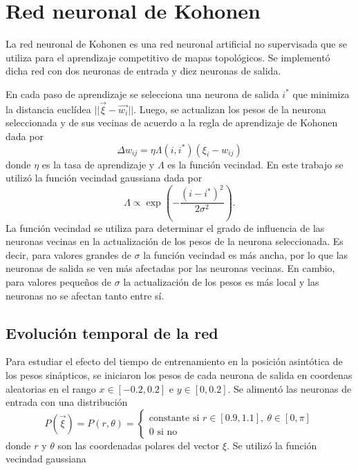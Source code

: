 \documentclass[11pt,twocolumn,twoside]{opticajnl}
\begin{document}
\section{Red neuronal de Kohonen \label{sec:ej1}}

\vspace{0.3cm}

La red neuronal de Kohonen es una red neuronal artificial no supervisada que se utiliza para el aprendizaje competitivo de mapas topológicos. Se implementó dicha red con dos neuronas de entrada y diez neuronas de salida. 

En cada paso de aprendizaje se selecciona una neurona de salida $i^*$ que minimiza la distancia euclídea $||\vec{\xi} - \vec{w_i}||$. Luego, se actualizan los pesos de la neurona seleccionada y de sus vecinas de acuerdo a la regla de aprendizaje de Kohonen dada por
\begin{equation}
    \Delta w_{ij} = \eta \Lambda(i,i^*) (\xi_i - w_{ij})
\end{equation}
donde $\eta$ es la tasa de aprendizaje y $\Lambda$ es la función vecindad. En este trabajo se utilizó la función vecindad gaussiana dada por 
\begin{equation}
    \Lambda \propto \exp(-\frac{(i-i^*)^2}{2\sigma^2}).
\end{equation}
La función vecindad se utiliza para determinar el grado de influencia de las neuronas vecinas en la actualización de los pesos de la neurona seleccionada. Es decir, para valores grandes de $\sigma$ la función vecindad es más ancha, por lo que las neuronas de salida se ven más afectadas por las neuronas vecinas. En cambio, para valores pequeños de $\sigma$ la actualización de los pesos es más local y las neuronas no se afectan tanto entre sí. 

\subsection{Evolución temporal de la red}

Para estudiar el efecto del tiempo de entrenamiento en la posición asintótica de los pesos sinápticos, se iniciaron los pesos de cada neurona de salida en coordenas aleatorias en el rango $x \in [-0.2,0.2]$ e $y \in [0,0.2]$. Se alimentó las neuronas de entrada con una distribución 
\begin{equation}
    P(\vec{\xi}) = P(r,\theta) = 
    \begin{cases}
        \text{constante si } r \in [0.9,1.1],~ \theta \in [0,\pi] \\
        0 \text{ si no}
    \end{cases}
\end{equation}
donde $r$ y $\theta$ son las coordenadas polares del vector $\xi$. Se utilizó la función vecindad gaussiana 
\end{document}
